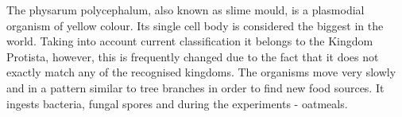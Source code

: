 The physarum polycephalum, also known as slime mould, is a plasmodial organism of yellow colour. Its single cell body is considered the biggest in the world. Taking into account current classification it belongs to the Kingdom Protista, however, this is frequently changed due to the fact that it does not exactly match any of the recognised kingdoms. The organisms move very slowly and in a pattern similar to tree branches in order to find new food sources. It ingests bacteria, fungal spores and during the experiments - oatmeals.








